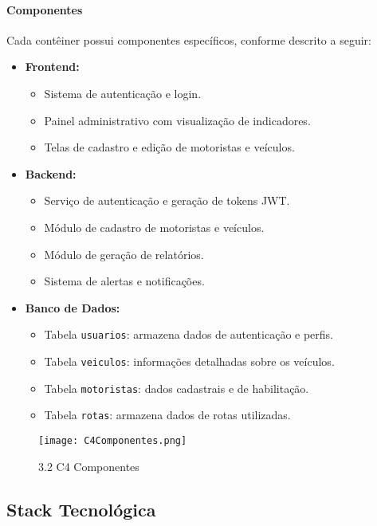 \documentclass[12pt]{article}
\begin{document}
\paragraph{Componentes}

Cada contêiner possui componentes específicos, conforme descrito a seguir:

\begin{itemize}
    \item \textbf{Frontend:}
    \begin{itemize}
        \item Sistema de autenticação e login.
        \item Painel administrativo com visualização de indicadores.
        \item Telas de cadastro e edição de motoristas e veículos.
    \end{itemize}
    \newpage
    \item \textbf{Backend:}
    \begin{itemize}
        \item Serviço de autenticação e geração de tokens JWT.
        \item Módulo de cadastro de motoristas e veículos.
        \item Módulo de geração de relatórios.
        \item Sistema de alertas e notificações.
    \end{itemize}
    
    \item \textbf{Banco de Dados:}
    \begin{itemize}
        \item Tabela \texttt{usuarios}: armazena dados de autenticação e perfis.
        \item Tabela \texttt{veiculos}: informações detalhadas sobre os veículos.
        \item Tabela \texttt{motoristas}: dados cadastrais e de habilitação.
        \item Tabela \texttt{rotas}: armazena dados de rotas utilizadas.
    \end{itemize}
\end{itemize}
\begin{figure}[!ht]
    \centering
    \texttt{[image: C4Componentes.png]}
    \caption{3.2 C4 Componentes}
    \label{fig::C4 Componentes}
\end{figure}
 \newpage
\subsection{Stack Tecnológica}
\end{document}
